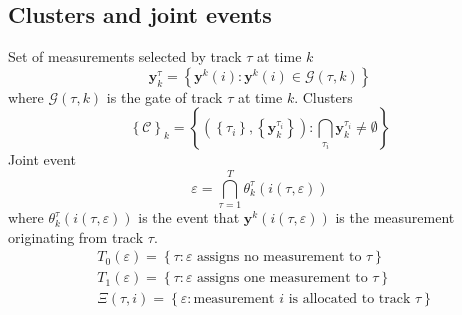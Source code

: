 \subsection{Clusters and joint events}
Set of measurements selected by track $\tau$ at time $k$
\begin{equation}
    \mathbf y_k^\tau = \left\{ \mathbf y^k(i) : \mathbf y^k(i) \in \mathcal G(\tau, k) \right\}
\end{equation}
where $\mathcal G(\tau, k)$ is the gate of track $\tau$ at time $k$.
Clusters
\begin{equation}
    \left\{ \mathcal C \right\}_k = \left\{ \left( \left\{ \tau_i \right\}, \left\{ \mathbf y^{\tau_i}_k \right\} \right) : \bigcap_{\tau_i}\mathbf y^{\tau_i}_k \neq\emptyset\right\}
\end{equation}
Joint event
\begin{equation}
    \varepsilon = \bigcap^T_{\tau=1}\theta_k^\tau(i(\tau, \varepsilon))
\end{equation}
where $\theta^\tau_k (i(\tau, \varepsilon))$ is the event that $\mathbf y^k (i(\tau, \varepsilon))$ is the measurement originating from track $\tau$.
\begin{align}
    &T_0(\varepsilon) = \left\{ \tau : \varepsilon \text{ assigns no measurement to } \tau \right\}\\
    &T_1(\varepsilon) = \left\{ \tau : \varepsilon \text{ assigns one measurement to } \tau\right\}\\
    &\Xi(\tau, i) = \left\{ \varepsilon : \text{measurement } i \text{ is allocated to track } \tau \right\}
\end{align}
